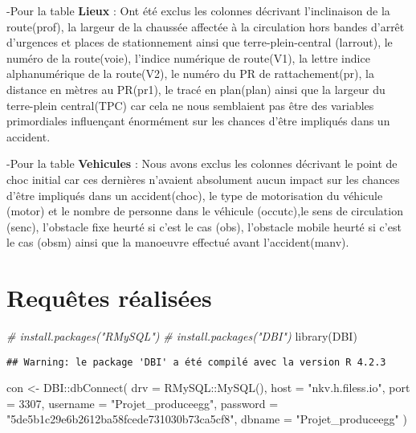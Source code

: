 \documentclass[mstat,12pt]{unswthesis}
\newenvironment{Shaded}{\begin{snugshade}}{\end{snugshade}}
\newcommand{\AttributeTok}[1]{\textcolor[rgb]{0.77,0.63,0.00}{#1}}
\newcommand{\CommentTok}[1]{\textcolor[rgb]{0.56,0.35,0.01}{\textit{#1}}}
\newcommand{\DecValTok}[1]{\textcolor[rgb]{0.00,0.00,0.81}{#1}}
\newcommand{\FunctionTok}[1]{\textcolor[rgb]{0.00,0.00,0.00}{#1}}
\newcommand{\NormalTok}[1]{#1}
\newcommand{\OtherTok}[1]{\textcolor[rgb]{0.56,0.35,0.01}{#1}}
\newcommand{\SpecialCharTok}[1]{\textcolor[rgb]{0.00,0.00,0.00}{#1}}
\newcommand{\StringTok}[1]{\textcolor[rgb]{0.31,0.60,0.02}{#1}}
\begin{document}
-Pour la table \textbf{Lieux} : Ont été exclus les colonnes décrivant
l'inclinaison de la route(prof), la largeur de la chaussée affectée à la
circulation hors bandes d'arrêt d'urgences et places de stationnement
ainsi que terre-plein-central (larrout), le numéro de la route(voie),
l'indice numérique de route(V1), la lettre indice alphanumérique de la
route(V2), le numéro du PR de rattachement(pr), la distance en mètres au
PR(pr1), le tracé en plan(plan) ainsi que la largeur du terre-plein
central(TPC) car cela ne nous semblaient pas être des variables
primordiales influençant énormément sur les chances d'être impliqués
dans un accident.\\
\medskip

-Pour la table \textbf{Vehicules} : Nous avons exclus les colonnes
décrivant le point de choc initial car ces dernières n'avaient
absolument aucun impact sur les chances d'être impliqués dans un
accident(choc), le type de motorisation du véhicule (motor) et le nombre
de personne dans le véhicule (occutc),le sens de circulation (senc),
l'obstacle fixe heurté si c'est le cas (obs), l'obstacle mobile heurté
si c'est le cas (obsm) ainsi que la manoeuvre effectué avant
l'accident(manv).

\hypertarget{requuxeates-ruxe9alisuxe9es}{%
\chapter{Requêtes réalisées}\label{requuxeates-ruxe9alisuxe9es}}

\scriptsize

\begin{Shaded}
\begin{Highlighting}[]
\CommentTok{\# install.packages("RMySQL")}
\CommentTok{\# install.packages("DBI")}
\FunctionTok{library}\NormalTok{(DBI)}
\end{Highlighting}
\end{Shaded}

\begin{verbatim}
## Warning: le package 'DBI' a été compilé avec la version R 4.2.3
\end{verbatim}

\begin{Shaded}
\begin{Highlighting}[]
\NormalTok{con }\OtherTok{\textless{}{-}}\NormalTok{ DBI}\SpecialCharTok{::}\FunctionTok{dbConnect}\NormalTok{(}
  \AttributeTok{drv =}\NormalTok{ RMySQL}\SpecialCharTok{::}\FunctionTok{MySQL}\NormalTok{(),    }
  \AttributeTok{host =} \StringTok{"nkv.h.filess.io"}\NormalTok{, }
  \AttributeTok{port =} \DecValTok{3307}\NormalTok{,               }
  \AttributeTok{username =} \StringTok{"Projet\_produceegg"}\NormalTok{, }
  \AttributeTok{password =} \StringTok{"5de5b1c29e6b2612ba58fcede731030b73ca5cf8"}\NormalTok{, }
  \AttributeTok{dbname =} \StringTok{"Projet\_produceegg"}    
\NormalTok{)}
\end{Highlighting}
\end{Shaded}
\end{document}
